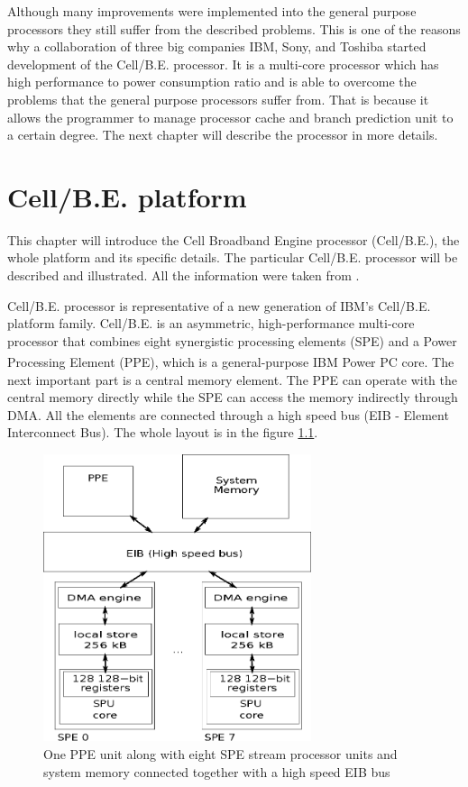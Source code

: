 \par
Although many improvements were implemented into the general purpose processors they still suffer from the described problems.
This is one of the reasons why a collaboration of three big companies IBM, Sony, and Toshiba started development of the \mbox{Cell/B.E.} processor.
It is a multi-core processor which has high performance to power consumption ratio and is able to overcome the problems that the general purpose processors suffer from.
That is because it allows the programmer to manage processor cache and branch prediction unit to a certain degree.
The next chapter will describe the processor in more details.

\chapter{\mbox{Cell/B.E.} platform}

This chapter will introduce the Cell Broadband Engine processor (\mbox{Cell/B.E.}), the whole platform and its specific details.
The particular \mbox{Cell/B.E.} processor will be described and illustrated.
All the information were taken from \cite{cbeCenter}.

\par
\mbox{Cell/B.E.} processor is representative of a new generation of IBM's \mbox{Cell/B.E.} platform family.
\mbox{Cell/B.E.} is an asymmetric, high-performance multi-core processor that combines eight synergistic processing elements (SPE) and a Power Processing Element (PPE), which is a general-purpose IBM Power PC\textsuperscript{\textregistered} core.
The next important part is a central memory element.
The PPE can operate with the central memory directly while the SPE can access the memory indirectly through DMA.
All the elements are connected through a high speed bus (EIB - Element Interconnect Bus).
The whole layout is in the figure \ref{fg:processorLayout}.

\begin{figure}
    \centering
    \includegraphics[width=0.7\textwidth]{data/cellLayout}
    \caption[\mbox{Cell/B.E.} processor layout]{One PPE unit along with eight SPE stream processor units and system memory connected together with a high speed EIB bus}
    \label{fg:processorLayout}
\end{figure}

